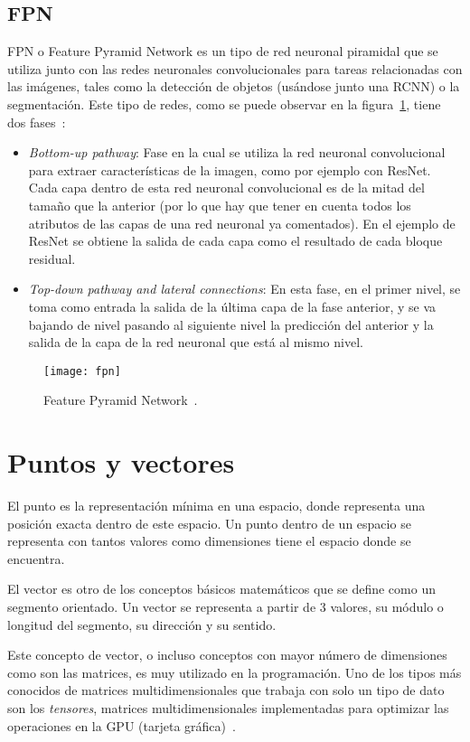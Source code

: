 \subsection{FPN}
FPN o Feature Pyramid Network es un tipo de red neuronal piramidal que se utiliza junto con las redes neuronales convolucionales para tareas relacionadas con las imágenes, tales como la detección de objetos (usándose junto una RCNN) o la segmentación. Este tipo de redes, como se puede observar en la figura~\ref{fig:fpn}, tiene dos fases~\cite{fpn}:
\begin{itemize}
	\item \textit{Bottom-up pathway}: Fase en la cual se utiliza la red neuronal convolucional para extraer características de la imagen, como por ejemplo con ResNet. Cada capa dentro de esta red neuronal convolucional es de la mitad del tamaño que la anterior (por lo que hay que tener en cuenta todos los atributos de las capas de una red neuronal ya comentados). En el ejemplo de ResNet se obtiene la salida de cada capa como el resultado de cada bloque residual.
	\item \textit{Top-down pathway and lateral connections}: En esta fase, en el primer nivel, se toma como entrada la salida de la última capa de la fase anterior, y se va bajando de nivel pasando al siguiente nivel la predicción del anterior y la salida de la capa de la red neuronal que está al mismo nivel.
\end{itemize}
\begin{figure}[h]
	\centering
	\texttt{[image: fpn]}
	\caption[Feature Pyramid Network.]{Feature Pyramid Network~\cite{fpn}.}
	\label{fig:fpn}
\end{figure}

\section{Puntos y vectores}
El punto es la representación mínima en una espacio, donde representa una posición exacta dentro de este espacio. Un punto dentro de un espacio se representa con tantos valores como dimensiones tiene el espacio donde se encuentra.

El vector es otro de los conceptos básicos matemáticos que se define como un segmento orientado. Un vector se representa a partir de 3 valores, su módulo o longitud del segmento, su dirección y su sentido.

Este concepto de vector, o incluso conceptos con mayor número de dimensiones como son las matrices, es muy utilizado en la programación. Uno de los tipos más conocidos de matrices multidimensionales que trabaja con solo un tipo de dato son los \textit{tensores}, matrices multidimensionales implementadas para optimizar las operaciones en la GPU (tarjeta gráfica)~\cite{tensor}. 

